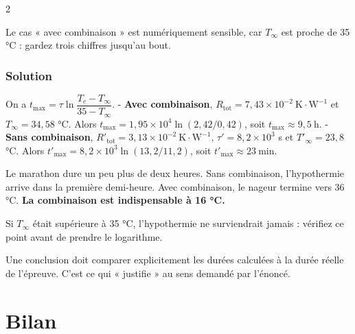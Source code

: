 \documentclass[11pt,a4paper]{article}
\begin{document}
\begin{indication}{2}

Le cas « avec combinaison » est numériquement sensible, car \(T_\infty\) est proche de 35 °C : gardez trois chiffres jusqu'au bout.

\end{indication}

\hypertarget{solution-39}{%
\subsubsection{Solution}\label{solution-39}}

On a \(t_{\text{max}} = \tau\ln\dfrac{T_c - T_\infty}{35 - T_\infty}\).
- \textbf{Avec combinaison}, \(R_{\text{tot}} = 7{,}43\times 10^{-2}\ \mathrm{K\cdot W^{-1}}\) et \(T_\infty = 34{,}58\) °C. Alors \(t_{\text{max}} = 1{,}95\times 10^4\ln(2{,}42/0{,}42)\), soit \(\boxed{t_{\text{max}} \approx 9{,}5\ \mathrm h}\).
- \textbf{Sans combinaison}, \(R'_{\text{tot}} = 3{,}13\times 10^{-2}\ \mathrm{K\cdot W^{-1}}\), \(\tau' = 8{,}2\times 10^3\) s et \(T'_\infty = 23{,}8\) °C. Alors \(t'_{\text{max}} = 8{,}2\times 10^3\ln(13{,}2/11{,}2)\), soit \(\boxed{t'_{\text{max}} \approx 23\ \mathrm{min}}\).

Le marathon dure un peu plus de deux heures. Sans combinaison, l'hypothermie arrive dans la première demi-heure. Avec combinaison, le nageur termine vers 36 °C. \textbf{La combinaison est indispensable à 16 °C.}

\begin{piege}

Si \(T_\infty\) était supérieure à 35 °C, l'hypothermie ne surviendrait jamais : vérifiez ce point avant de prendre le logarithme.

\end{piege}

\begin{jury}

Une conclusion doit comparer explicitement les durées calculées à la durée réelle de l'épreuve. C'est ce qui « justifie » au sens demandé par l'énoncé.

\end{jury}

\hypertarget{bilan}{%
\section{Bilan}\label{bilan}}
\end{document}
